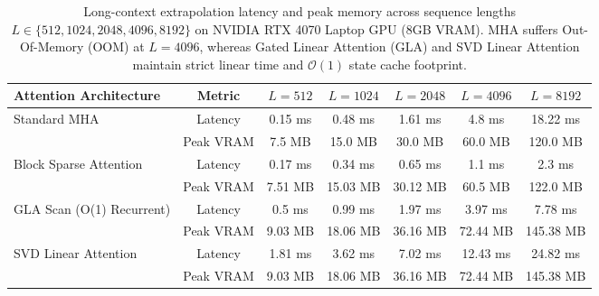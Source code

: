 \documentclass[journal]{IEEEtran}
\begin{document}
\begin{table}[t]
\centering
\caption{Long-context extrapolation latency and peak memory across sequence lengths $L \in \{512, 1024, 2048, 4096, 8192\}$ on NVIDIA RTX 4070 Laptop GPU (8GB VRAM). MHA suffers Out-Of-Memory (OOM) at $L=4096$, whereas Gated Linear Attention (GLA) and SVD Linear Attention maintain strict linear time and $\mathcal{O}(1)$ state cache footprint.}
\label{tab:long_context_scaling}
\small
\begin{tabular}{lcccccc}
\toprule
\textbf{Attention Architecture} & \textbf{Metric} & $L=512$ & $L=1024$ & $L=2048$ & $L=4096$ & $L=8192$ \\
\midrule
\multirow{2}{*}{Standard MHA} & Latency & 0.15 ms & 0.48 ms & 1.61 ms & 4.8 ms & 18.22 ms \\
 & Peak VRAM & 7.5 MB & 15.0 MB & 30.0 MB & 60.0 MB & 120.0 MB \\
\midrule
\multirow{2}{*}{Block Sparse Attention} & Latency & 0.17 ms & 0.34 ms & 0.65 ms & 1.1 ms & 2.3 ms \\
 & Peak VRAM & 7.51 MB & 15.03 MB & 30.12 MB & 60.5 MB & 122.0 MB \\
\midrule
\multirow{2}{*}{GLA Scan (O(1) Recurrent)} & Latency & 0.5 ms & 0.99 ms & 1.97 ms & 3.97 ms & 7.78 ms \\
 & Peak VRAM & 9.03 MB & 18.06 MB & 36.16 MB & 72.44 MB & 145.38 MB \\
\midrule
\multirow{2}{*}{SVD Linear Attention} & Latency & 1.81 ms & 3.62 ms & 7.02 ms & 12.43 ms & 24.82 ms \\
 & Peak VRAM & 9.03 MB & 18.06 MB & 36.16 MB & 72.44 MB & 145.38 MB \\
\bottomrule
\end{tabular}
\end{table}
\end{document}
